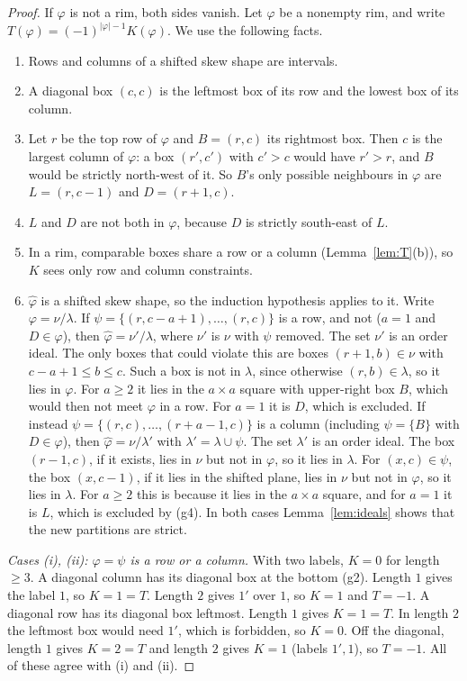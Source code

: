 \documentclass[11pt]{amsart}
\theoremstyle{definition}
\theoremstyle{remark}
\begin{document}
\begin{proof}
If $\varphi$ is not a rim, both sides vanish. Let $\varphi$ be a nonempty rim, and write
$T(\varphi)=(-1)^{|\varphi|-1}K(\varphi)$. We use the following facts.
\begin{enumerate}[label=(g\arabic*)]
\item Rows and columns of a shifted skew shape are intervals.
\item A diagonal box $(c,c)$ is the leftmost box of its row and the lowest box of its column.
\item Let $r$ be the top row of $\varphi$ and $B=(r,c)$ its rightmost box. Then $c$ is the largest
column of $\varphi$: a box $(r',c')$ with $c'>c$ would have $r'>r$, and $B$ would be strictly
north-west of it. So $B$'s only possible neighbours in $\varphi$ are $L=(r,c-1)$ and
$D=(r+1,c)$.
\item $L$ and $D$ are not both in $\varphi$, because $D$ is strictly south-east of $L$.
\item In a rim, comparable boxes share a row or a column (Lemma~\ref{lem:T}(b)), so $K$ sees
only row and column constraints.
\item $\hat\varphi$ is a shifted skew shape, so the induction hypothesis applies to it. Write
$\varphi=\nu/\lambda$. If $\psi=\{(r,c-a+1),\dots,(r,c)\}$ is a row, and not ($a=1$ and
$D\in\varphi$), then $\hat\varphi=\nu'/\lambda$, where $\nu'$ is $\nu$ with $\psi$ removed. The set
$\nu'$ is an order ideal. The only boxes that could violate this are boxes $(r+1,b)\in\nu$ with
$c-a+1\le b\le c$. Such a box is not in $\lambda$, since otherwise $(r,b)\in\lambda$, so it lies in
$\varphi$. For $a\ge2$ it lies in the $a\times a$ square with upper-right box $B$, which would then
not meet $\varphi$ in a row. For $a=1$ it is $D$, which is excluded. If instead
$\psi=\{(r,c),\dots,(r+a-1,c)\}$ is a column (including $\psi=\{B\}$ with $D\in\varphi$), then
$\hat\varphi=\nu/\lambda'$ with $\lambda'=\lambda\cup\psi$. The set $\lambda'$ is an order ideal.
The box $(r-1,c)$, if it exists, lies in $\nu$ but not in $\varphi$, so it lies in $\lambda$. For
$(x,c)\in\psi$, the box $(x,c-1)$, if it lies in the shifted plane, lies in $\nu$ but not in
$\varphi$, so it lies in $\lambda$. For $a\ge2$ this is because it lies in the $a\times a$
square, and for $a=1$ it is $L$, which is excluded by (g4). In both cases
Lemma~\ref{lem:ideals} shows that the new partitions are strict.
\end{enumerate}

\emph{Cases (i), (ii): $\varphi=\psi$ is a row or a column.} With two labels, $K=0$ for length
$\ge3$. A diagonal column has its diagonal box at the bottom (g2). Length $1$ gives the label
$1$, so $K=1=T$. Length $2$ gives $1'$ over $1$, so $K=1$ and $T=-1$. A diagonal row has its
diagonal box leftmost. Length $1$ gives $K=1=T$. In length $2$ the leftmost box would need
$1'$, which is forbidden, so $K=0$. Off the diagonal, length $1$ gives $K=2=T$ and length $2$
gives $K=1$ (labels $1',1$), so $T=-1$. All of these agree with (i) and (ii).


\end{proof}
\end{document}
